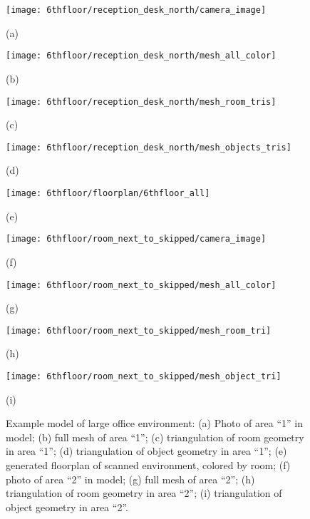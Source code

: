 \documentclass[review]{acmsiggraph}
\begin{document}
\begin{figure*}[t]

	\begin{minipage}[t]{0.24\linewidth}
		\centerline{\texttt{[image: 6thfloor/reception\_desk\_north/camera\_image]}}
		\centerline{(a)}
	\end{minipage}
	\hfill
	\begin{minipage}[t]{0.24\linewidth}
		\centerline{\texttt{[image: 6thfloor/reception\_desk\_north/mesh\_all\_color]}}
		\centerline{(b)}
	\end{minipage}
	\hfill
	\begin{minipage}[t]{0.24\linewidth}
		\centerline{\texttt{[image: 6thfloor/reception\_desk\_north/mesh\_room\_tris]}}
		\centerline{(c)}
	\end{minipage}
	\hfill
	\begin{minipage}[t]{0.24\linewidth}
		\centerline{\texttt{[image: 6thfloor/reception\_desk\_north/mesh\_objects\_tris]}}
		\centerline{(d)}
	\end{minipage}

	\begin{minipage}[t]{1.0\linewidth}
		\centerline{\texttt{[image: 6thfloor/floorplan/6thfloor\_all]}}
		\centerline{(e)}
	\end{minipage}

	\begin{minipage}[t]{0.24\linewidth}
		\centerline{\texttt{[image: 6thfloor/room\_next\_to\_skipped/camera\_image]}}
		\centerline{(f)}
	\end{minipage}
	\hfill
	\begin{minipage}[t]{0.24\linewidth}
		\centerline{\texttt{[image: 6thfloor/room\_next\_to\_skipped/mesh\_all\_color]}}
		\centerline{(g)}
	\end{minipage}
	\hfill
	\begin{minipage}[t]{0.24\linewidth}
		\centerline{\texttt{[image: 6thfloor/room\_next\_to\_skipped/mesh\_room\_tri]}}
		\centerline{(h)}
	\end{minipage}
	\hfill
	\begin{minipage}[t]{0.24\linewidth}
		\centerline{\texttt{[image: 6thfloor/room\_next\_to\_skipped/mesh\_object\_tri]}}
		\centerline{(i)}
	\end{minipage}	

	\caption{Example model of large office environment:  (a) Photo of area ``1'' in model; (b) full mesh of area ``1''; (c) triangulation of room geometry in area ``1''; (d) triangulation of object geometry in area ``1''; (e) generated floorplan of scanned environment, colored by room; (f) photo of area ``2'' in model; (g) full mesh of area ``2''; (h) triangulation of room geometry in area ``2''; (i) triangulation of object geometry in area ``2''.}
	\label{fig:6thfloor}

\end{figure*}
\end{document}
